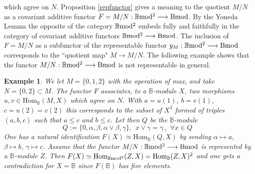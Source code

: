 \documentclass[12pt]{article}
\newtheorem{example}[thm]{Example}
\def\Hom{{\rm Hom}}
\def\B{{\mathbb B}}
\def\qqq{\,,\,~\forall}
\def\Hom {{\mbox{Hom}}}
\def\bm2{{\rm \B mod^2}}
\begin{document}
which agree on $N$. 
\endproof
Proposition \ref{repfunctor} gives a meaning to the quotient $M/N$ as a covariant additive functor $F=M/N:\bm2\longrightarrow {\rm Bmod}$.  By the Yoneda Lemma  the opposite of the category $\bm2$ embeds fully and faithfully  in the category of covariant additive functors $\bm2\longrightarrow {\rm Bmod}$. The inclusion of $F=M/N$ as a subfunctor of the representable functor $y_M:\bm2\longrightarrow {\rm Bmod}$ corresponds to the ``quotient map" $M\to M/N$. The following example shows that the functor $M/N:\bm2\longrightarrow {\rm Bmod}$ is not representable in general.
\begin{example}\label{example not representable}
 We let $M=\{0,1,2\}$ with the operation of max, and take $N=\{0,2\}\subset M$. The functor $F$ associates, to a $\B$-module $X$, two morphisms $u,v\in \Hom_\B(M,X)$ which agree on $N$. With $a=u(1)$, $b=v(1)$, $c=u(2)=v(2)$ this corresponds to the subset of $X^3$ formed of triples $(a,b,c)$ such that $a\leq c$ and $b\leq c$. Let then $Q$ be the $\B$-module 
$$
Q:=\{0,\alpha,\beta,\alpha\vee \beta,\gamma\}, \ \ x\vee \gamma=\gamma\qqq x\in Q
$$
One has a natural identification $F(X)\simeq \Hom_\B(Q,X)$ by sending $\alpha\mapsto a$, $\beta\mapsto b$, $\gamma\mapsto c$. Assume that the functor $M/N:\bm2\longrightarrow {\rm Bmod}$ is represented by a $\B$-module $Z$. Then  $F(X)\simeq \Hom_\bm2(Z,X)=\Hom_\B(Z,X)^2$ and one gets a contradiction for $X=\B$ since $F(\B)$ has five elements.\end{example}
\end{document}
